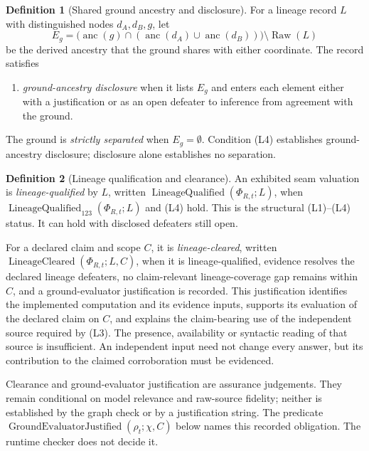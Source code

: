 \documentclass[11pt]{article}
\theoremstyle{definition}
\newtheorem{definition}{Definition}[section]
\begin{document}
\begin{definition}[Shared ground ancestry and disclosure]\label{ex:def:separation}
For a lineage record $L$ with distinguished nodes $d_A,d_B,g$, let
\[
E_g=\bigl(\operatorname{anc}(g)\cap(\operatorname{anc}(d_A)\cup\operatorname{anc}(d_B))\bigr)\setminus\operatorname{Raw}(L)
\]
be the derived ancestry that the ground shares with either coordinate. The record satisfies
\begin{enumerate}
\item[(L4)] \emph{ground-ancestry disclosure} when it lists $E_g$ and enters each element either with a justification or as an open defeater to inference from agreement with the ground.
\end{enumerate}
The ground is \emph{strictly separated} when $E_g=\emptyset$. Condition (L4) establishes ground-ancestry disclosure; disclosure alone establishes no separation.
\end{definition}

\begin{definition}[Lineage qualification and clearance]\label{ex:def:lineage-qualified}
An exhibited seam valuation is \emph{lineage-qualified} by $L$, written $\operatorname{LineageQualified}(\Phi_{R,t};L)$, when $\operatorname{LineageQualified}_{123}(\Phi_{R,t};L)$ and (L4) hold. This is the structural (L1)--(L4) status. It can hold with disclosed defeaters still open.

For a declared claim and scope $C$, it is \emph{lineage-cleared}, written $\operatorname{LineageCleared}(\Phi_{R,t};L,C)$, when it is lineage-qualified, evidence resolves the declared lineage defeaters, no claim-relevant lineage-coverage gap remains within $C$, and a ground-evaluator justification is recorded. This justification identifies the implemented computation and its evidence inputs, supports its evaluation of the declared claim on $C$, and explains the claim-bearing use of the independent source required by (L3). The presence, availability or syntactic reading of that source is insufficient. An independent input need not change every answer, but its contribution to the claimed corroboration must be evidenced.

Clearance and ground-evaluator justification are assurance judgements. They remain conditional on model relevance and raw-source fidelity; neither is established by the graph check or by a justification string. The predicate $\operatorname{GroundEvaluatorJustified}(\rho_t;\chi,C)$ below names this recorded obligation. The runtime checker does not decide it.
\end{definition}
\end{document}
